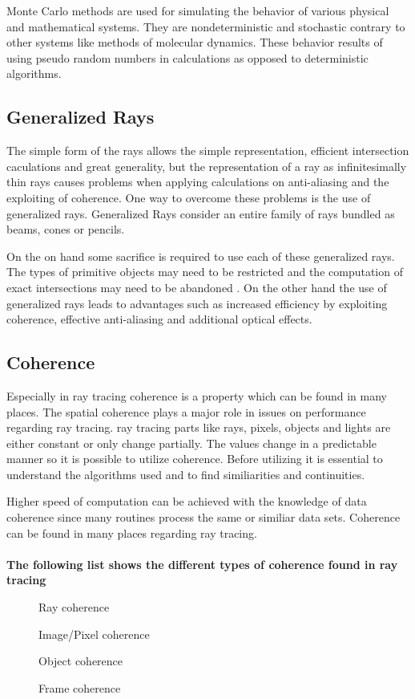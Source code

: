 \documentclass[DIV10, abstracton, openright, footsepline, headsepline, twoside, 9pt,
bigheadings]{scrreprt}
\begin{document}
Monte Carlo methods are used for simulating the behavior of various physical
and mathematical systems. They are nondeterministic and stochastic contrary to
other systems like methods of molecular dynamics. These behavior results of
using pseudo random numbers in calculations as opposed to deterministic
algorithms.

\subsection{Generalized Rays}
The simple form of the rays  allows the simple representation, efficient
intersection caculations and great generality, but the representation of a ray
as infinitesimally thin rays causes problems when applying calculations on
anti-aliasing and the exploiting of coherence. One way to overcome these
problems is the use of generalized rays. Generalized Rays consider an entire
family of rays bundled as beams, cones or pencils.

On the on hand some sacrifice is required to use each of these generalized rays.
The types of primitive objects may need to be restricted and the computation of
exact intersections may need to be abandoned \cite{Glassner89}. On the other
hand the use of generalized rays leads to advantages such as increased efficiency
by exploiting coherence, effective anti-aliasing and additional optical effects.


\subsection{Coherence}
Especially in ray tracing coherence is a property which can be found in many
places. The spatial coherence plays a major role in issues on performance
regarding ray tracing. ray tracing parts like rays, pixels, objects and lights
are either constant or only change partially. The values change in a predictable
manner so it is possible to utilize coherence. Before utilizing it is essential
to understand the algorithms used and to find similiarities and continuities.

Higher speed of computation can be achieved with the knowledge of data coherence
since many routines process the same or similiar data sets. Coherence
can be found in many places regarding ray tracing.\\\\
\textbf{The following list shows the different types of coherence found in
ray tracing}
\begin{description}
\item[\color{Bigblue}{$\triangleright$}] Ray coherence
\item[\color{Bigblue}{$\triangleright$}] Image/Pixel coherence
\item[\color{Bigblue}{$\triangleright$}] Object coherence
\item[\color{Bigblue}{$\triangleright$}] Frame coherence
\end{description}
\end{document}

